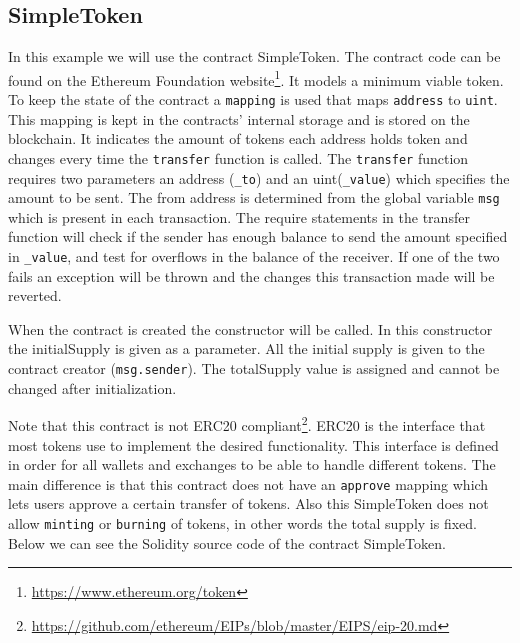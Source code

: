 \documentclass[a4paper]{article}
\begin{document}
\subsection{SimpleToken}
In this example we will use the contract SimpleToken. The contract code can be found on the Ethereum Foundation website\footnote{\url{https://www.ethereum.org/token}}. 
It models a minimum viable token. To keep the state of the contract a \texttt{mapping} is used that maps \texttt{address} to \texttt{uint}. This mapping is kept in the contracts' internal storage and is stored on the blockchain. It indicates the amount of tokens each address holds token and changes every time the \texttt{transfer} function is called. The \texttt{transfer} function requires two parameters an address (\texttt{\_to})  and an uint(\texttt{\_value}) which specifies the amount to be sent. The from address is determined from the global variable \texttt{msg} which is present in each transaction. The require statements in the transfer function will check if the sender has enough balance to send the amount specified in \texttt{\_value}, and test for overflows in the balance of the receiver. If one of the two fails an exception will be thrown and the changes this transaction made will be reverted.\par
When the contract is created the constructor will be called. In this constructor the initialSupply is given as a parameter. All the initial supply is given to the contract creator (\texttt{msg.sender}). The totalSupply value is assigned and cannot be changed after initialization.\par
Note that this contract is not ERC20 compliant\footnote{\url{https://github.com/ethereum/EIPs/blob/master/EIPS/eip-20.md}}. ERC20 is the interface that most tokens use to implement the desired functionality. This interface is defined in order for all wallets and exchanges to be able to handle different tokens. The main difference is that this contract does not have an \texttt{approve} mapping which lets users approve a certain transfer of tokens. Also this SimpleToken does not allow \texttt{minting} or \texttt{burning} of tokens, in other words the total supply is fixed. Below we can see the Solidity source code of the contract SimpleToken.


\end{document}
